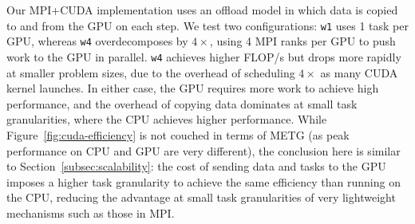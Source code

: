 Our MPI+CUDA implementation uses an offload model in which data is copied to and from the GPU on each step. We test
two configurations: \lstinline{w1} uses 1 task per GPU, whereas
\lstinline{w4} overdecomposes by $4\times$, using 4 MPI
ranks per GPU to push work to the GPU in parallel.
\lstinline{w4} achieves higher FLOP/s but
drops more rapidly at smaller problem sizes, due to the overhead of
scheduling $4\times$ as many CUDA kernel launches. In either case, the
GPU requires more work to achieve high performance, and the overhead
of copying data dominates at small task
granularities, where the CPU achieves higher
performance. While Figure~\ref{fig:cuda-efficiency} is not couched in
terms of METG (as peak performance on CPU and GPU are very
different), the conclusion here is similar to
Section~\ref{subsec:scalability}: the cost of sending data and
tasks to the GPU imposes a higher task granularity to achieve
the same efficiency than running on the CPU, reducing the advantage at small task granularities of
very lightweight mechanisms such as those in MPI.
